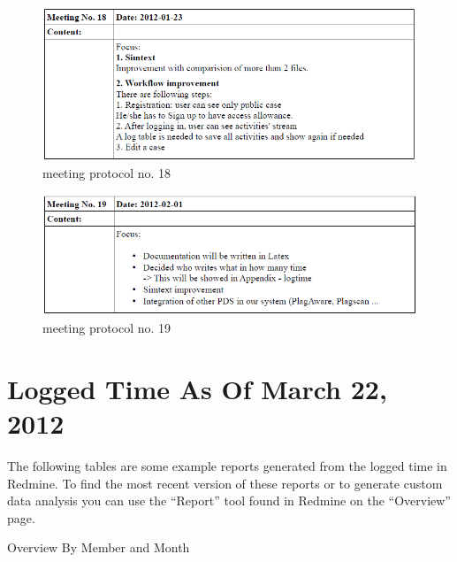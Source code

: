 \begin{appendix}
\begin{figure}[htbp]
  \centering
    \includegraphics[width=\textwidth]{images/a_meetings/meeting_18}
  \caption{meeting protocol no. 18}
  \label{fig:meeting protocol no. 18}
\end{figure}

\begin{figure}[htbp]
  \centering
    \includegraphics[width=\textwidth]{images/a_meetings/meeting_19}
  \caption{meeting protocol no. 19}
  \label{fig:meeting protocol no. 19}
\end{figure}

\chapter{Logged Time As Of March 22, 2012}

The following tables are some example reports generated from the logged time in Redmine. To find the most recent version
of these reports or to generate custom data analysis you can use the \enquote{Report} tool found in Redmine on the \enquote{Overview}
page.


\begin{table}[htbp]
  \caption{Overview By Member and Month}
  \centering
\end{table}


\end{appendix}
